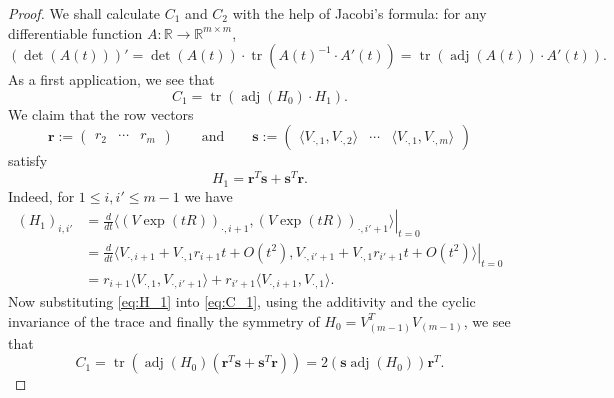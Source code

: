 \documentclass[11pt,oneside]{amsart}
\numberwithin{equation}{section}
\theoremstyle{remark}
\theoremstyle{plain}
\DeclareMathOperator{\adj}{adj}
\DeclareMathOperator{\tr}{tr}
\newcommand\RR{\mathbb{R}}
\newcommand{\br}{\mathbf{r}}
\newcommand{\mbs}{\mathbf{s}}
\renewcommand\leq{\leqslant}
\begin{document}
\begin{proof}
We shall calculate $C_1$ and $C_2$ with the help of Jacobi's formula: for any differentiable function $A:\RR\to\RR^{m\times m}$,
\begin{equation}\label{eq:jacobi-formula}
(\det(A(t)))' = \det(A(t)) \cdot \tr\left(A(t)^{-1}\cdot A'(t) \right) = \tr \left(\adj(A(t)) \cdot A'(t)\right).
\end{equation}
As a first application, we see that
\begin{equation}\label{eq:C_1}
C_1 = \tr(\adj(H_0)\cdot H_1).
\end{equation}
We claim that the row vectors
\[\br:=\begin{pmatrix}
r_2 & \cdots & r_m
\end{pmatrix}
\qquad \text{and} \qquad \mbs:=\begin{pmatrix} \langle V_{\cdot,1}, V_{\cdot,2} \rangle & \cdots & \langle V_{\cdot,1}, V_{\cdot,m} \rangle \end{pmatrix}\]
satisfy
\begin{equation}\label{eq:H_1}
H_1=\br^T\mbs+\mbs^T\br.
\end{equation}
Indeed, for $1\leq i,i' \leq m-1$ we have
\[
\begin{split}
(H_1)_{i,i'}&=\left.\frac{d}{dt}\langle (V\exp(tR))_{\cdot,i+1}, (V\exp(tR))_{\cdot,i'+1} \rangle \right|_{t=0}
\\ & = \left. \frac{d}{dt} \langle V_{\cdot,i+1}+ V_{\cdot,1} r_{i+1} t + O(t^2), V_{\cdot,i'+1} + V_{\cdot,1} r_{i'+1} t + O(t^2) \rangle \right|_{t=0}
\\ & = r_{i+1} \langle V_{\cdot,1}, V_{\cdot,i'+1} \rangle + r_{i'+1} \langle V_{\cdot,i+1}, V_{\cdot,1} \rangle.
\end{split}
\]
Now substituting \eqref{eq:H_1} into \eqref{eq:C_1}, using the additivity and the cyclic invariance of the trace and finally the symmetry of $H_0=V_{(m-1)}^T V_{(m-1)}$, we see that
\begin{equation}\label{eq:C_1-result}
C_1=\tr(\adj(H_0) (\br^T\mbs+\mbs^T\br)) = 2 (\mbs \adj(H_0)) \br^T.
\end{equation}


\end{proof}
\end{document}
